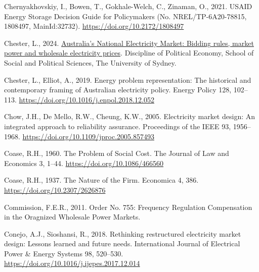 \documentclass[12pt,a4paper,]{report}
\newlength{\cslhangindent}
\newenvironment{CSLReferences}[2] %
 {%
  \setlength{\parindent}{0pt}
  \ifodd #1 \everypar{\setlength{\hangindent}{\cslhangindent}}\ignorespaces\fi
  \ifnum #2 > 0
  \setlength{\parskip}{#2\baselineskip}
  \fi
 }%
 {}
\begin{document}
\begin{CSLReferences}{1}{0}
\leavevmode{}%
Chernyakhovskiy, I., Bowen, T., Gokhale-Welch, C., Zinaman, O., 2021.
{USAID Energy Storage Decision Guide} for {Policymakers} (No.
NREL/TP-6A20-78815, 1808497, MainId:32732).
\url{https://doi.org/10.2172/1808497}

\leavevmode{}%
Chester, L., 2024.
\href{https://ses.library.usyd.edu.au/bitstream/handle/2123/32110/Australia\%27s\%20NEM_Bidding\%20rules\%20market\%20power\%20and\%20wholesale\%20electricity\%20prices\%20FINAL\%20UPDATED\%202\%20FEBRUARY\%202024.pdf?sequence=3}{Australia's
{National Electricity Market}: {Bidding} rules, market power and
wholesale electricity prices}. {Discipline of Political Economy, School
of Social and Political Sciences, The University of Sydney}.

\leavevmode{}%
Chester, L., Elliot, A., 2019. Energy problem representation: {The}
historical and contemporary framing of {Australian} electricity policy.
Energy Policy 128, 102--113.
\url{https://doi.org/10.1016/j.enpol.2018.12.052}

\leavevmode{}%
Chow, J.H., De Mello, R.W., Cheung, K.W., 2005. Electricity market
design: {An} integrated approach to reliability assurance. Proceedings
of the IEEE 93, 1956--1968.
\url{https://doi.org/10.1109/jproc.2005.857493}

\leavevmode{}%
Coase, R.H., 1960. The {Problem} of {Social Cost}. The Journal of Law
and Economics 3, 1--44. \url{https://doi.org/10.1086/466560}

\leavevmode{}%
Coase, R.H., 1937. The {Nature} of the {Firm}. Economica 4, 386.
\url{https://doi.org/10.2307/2626876}

\leavevmode{}%
Commission, F.E.R., 2011. Order {No}. 755: {Frequency Regulation
Compensation} in the {Oragnized Wholesale Power Markets}.

\leavevmode{}%
Conejo, A.J., Sioshansi, R., 2018. Rethinking restructured electricity
market design: {Lessons} learned and future needs. International Journal
of Electrical Power \& Energy Systems 98, 520--530.
\url{https://doi.org/10.1016/j.ijepes.2017.12.014}


\end{CSLReferences}
\end{document}
